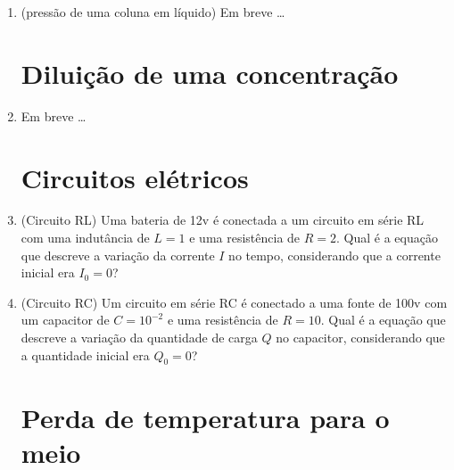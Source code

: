 \documentclass[a4paper]{article}
\begin{document}
\begin{enumerate}
\item (pressão de uma coluna em líquido) Em breve \ldots




\section{Diluição de uma concentração}

\item Em breve \ldots



\section{Circuitos elétricos}

\item (Circuito RL) Uma bateria de 12v é conectada a um circuito em
  série RL com uma indutância de $L=1$ e uma resistência de
  $R=2$. Qual é a equação que descreve a variação da corrente $I$ no
  tempo, considerando que a corrente inicial era $I_0=0$?


\item (Circuito RC) Um circuito em série RC é conectado a uma fonte de
  100v com um capacitor de $C=10^{-2}$ e uma resistência de
  $R=10$. Qual é a equação que descreve a variação da quantidade de
  carga $Q$ no capacitor, considerando que a quantidade inicial era
  $Q_0=0$?



\section{Perda de temperatura para o meio}


\end{enumerate}
\end{document}
